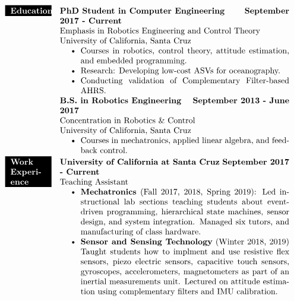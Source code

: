 \documentclass[paper=a4,fontsize=11pt]{article} %
\def \mainColWidth {0.8\textwidth}		%
\def \leftColWidth {0.125\textwidth}		%
\begin{document}
\begin{align*}
		\colorbox{black}{\color{white}{
			\parbox[t]{\leftColWidth}{%
				\textbf{Education}}
			}%
		}
		& &
		\parbox[t]{\mainColWidth}{%
			\textbf{PhD Student in Computer Engineering} \hfill \textbf{September 2017 - Current} \\
			Emphasis in Robotics Engineering and Control Theory\\
			University of California, Santa Cruz
			\begin{itemize}[noitemsep,topsep=0pt]
			\item Courses in robotics, control theory, attitude estimation, and embedded programming.
			\item Research: Developing low-cost ASVs for oceanography. 
			\item Conducting validation of Complementary Filter-based AHRS.
			\end{itemize}
			\textbf{B.S. in Robotics Engineering} \hfill \textbf{September 2013 - June 2017}\\
			Concentration in Robotics \& Control\\
			University of California, Santa Cruz
			\begin{itemize}[noitemsep,topsep=0pt]
			\item Courses in mechatronics, applied linear algebra, and feedback control.
			\end{itemize}
		}%
	\\
		\colorbox{black}{\color{white}{
				\parbox[t]{\leftColWidth}{%
					\textbf{Work Experience}}
			}%
		}
		& &
		\parbox[t]{\mainColWidth}{%
			\textbf{University of California at Santa Cruz} \hfill \textbf{September 2017 - Current}\\
			\quad Teaching Assistant
			\begin{itemize}[noitemsep,topsep=0pt]
			\item \textbf{Mechatronics} (Fall 2017, 2018, Spring 2019): Led instructional lab sections teaching students about event-driven programming, hierarchical state machines, sensor design, and system integration. Managed six tutors, and manufacturing of class hardware.
			\item \textbf{Sensor and Sensing Technology} (Winter 2018, 2019) Taught students how to implment and use resistive flex sensors, piezo electric sensors, capacitive touch sensors, gyroscopes, accelerometers, magnetometers as part of an inertial measurements unit. Lectured on attitude estimation using complementary filters and IMU calibration.

\end{itemize}}
\end{align*}
\end{document}
